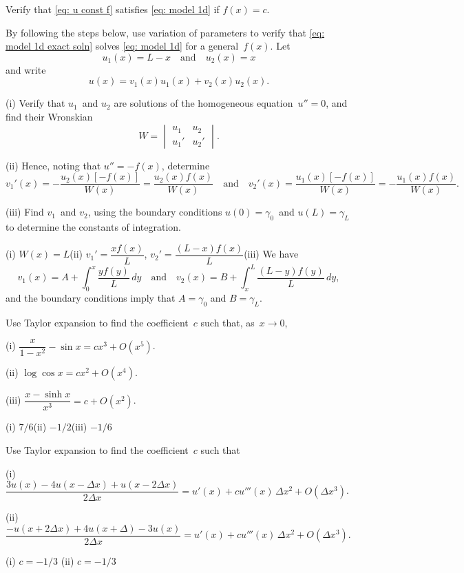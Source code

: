 \begin{Exercises}

\exercise
Verify that \eqref{eq: u const f} satisfies \eqref{eq: model 1d} if $f(x)=c$.

\exercise
By following the steps below, use variation of parameters to  verify that 
\eqref{eq: model 1d exact soln} solves \eqref{eq: model 1d} for a 
general~$f(x)$.  Let
\[
u_1(x)=L-x\quad\text{and}\quad u_2(x)=x
\]
and write
\[
u(x)=v_1(x)u_1(x)+v_2(x)u_2(x).
\]
\begin{description}
\item{(i)} Verify that $u_1$~and $u_2$ are solutions of the homogeneous 
equation~$u''=0$, and find their Wronskian
\[
W=\begin{vmatrix}u_1&u_2\\ u_1'&u_2' \end{vmatrix}.
\]
\item{(ii)} Hence, noting that $u''=-f(x)$, determine
\[
v_1'(x)=-\frac{u_2(x)[-f(x)]}{W(x)}=\frac{u_2(x)f(x)}{W(x)}
\quad\text{and}\quad
v_2'(x)=\frac{u_1(x)[-f(x)]}{W(x)}=-\frac{u_1(x)f(x)}{W(x)}.
\]
\item{(iii)}
Find $v_1$~and $v_2$, using the boundary conditions $u(0)=\gamma_0$~and 
$u(L)=\gamma_L$ to determine the constants of integration.
\end{description}
\begin{ans}
(i) $W(x)=L$\quad (ii) $v_1'=\dfrac{xf(x)}{L}$, 
$v_2'=\dfrac{(L-x)f(x)}{L}$\quad (iii) We have
\[
v_1(x)=A+\int_0^x\frac{yf(y)}{L}\,dy
\quad\text{and}\quad
v_2(x)=B+\int_x^L\frac{(L-y)f(y)}{L}\,dy,
\]
and the boundary conditions imply that $A=\gamma_0$ and $B=\gamma_L$.
\end{ans}


\exercise
Use Taylor expansion to find the coefficient~$c$ such that, as~$x\to0$,
\begin{description}
\item{(i)}
$\dfrac{x}{1-x^2}-\sin x=cx^3+O(x^5)$.
\item{(ii)}
$\log\cos x=cx^2+O(x^4)$.
\item{(iii)}
$\dfrac{x-\sinh x}{x^3}=c+O(x^2)$.
\end{description}
\begin{ans}
(i) $7/6$\quad (ii) $-1/2$\quad (iii) $-1/6$
\end{ans}

\exercise
Use Taylor expansion to find the coefficient~$c$ such that
\begin{description}
\item{(i)} $\dfrac{3u(x)-4u(x-\Delta x)+u(x-2\Delta x)}{2\Delta x}
=u'(x)+cu'''(x)\,\Delta x^2+O(\Delta x^3)$.
\item{(ii)} $\dfrac{-u(x+2\Delta x)+4u(x+\Delta)-3u(x)}{2\Delta x}
=u'(x)+cu'''(x)\,\Delta x^2+O(\Delta x^3)$.
\end{description}
\begin{ans}
(i) $c=-1/3$ \quad(ii) $c=-1/3$
\end{ans}


\end{Exercises}
